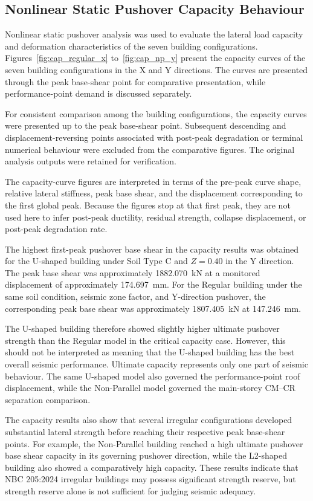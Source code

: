 \subsection{Nonlinear Static Pushover Capacity Behaviour}
Nonlinear static pushover analysis was used to evaluate the lateral load capacity and deformation characteristics of the seven building configurations. Figures~\ref{fig:cap_regular_x} to~\ref{fig:cap_np_y} present the capacity curves of the seven building configurations in the X and Y directions. The curves are presented through the peak base-shear point for comparative presentation, while performance-point demand is discussed separately.

For consistent comparison among the building configurations, the capacity curves were presented up to the peak base-shear point. Subsequent descending and displacement-\allowbreak{}reversing points associated with post-peak degradation or terminal numerical behaviour were excluded from the comparative figures. The original analysis outputs were retained for verification.

The capacity-curve figures are interpreted in terms of the pre-peak curve shape, relative lateral stiffness, peak base shear, and the displacement corresponding to the first global peak. Because the figures stop at that first peak, they are not used here to infer post-peak ductility, residual strength, collapse displacement, or post-peak degradation rate.

The highest first-peak pushover base shear in the capacity results was obtained for the U-shaped building under Soil Type C and $Z=0.40$ in the Y direction. The peak base shear was approximately 1882.070~kN at a monitored displacement of approximately 174.697~mm. For the Regular building under the same soil condition, seismic zone factor, and Y-direction pushover, the corresponding peak base shear was approximately 1807.405~kN at 147.246~mm.

The U-shaped building therefore showed slightly higher ultimate pushover strength than the Regular model in the critical capacity case. However, this should not be interpreted as meaning that the U-shaped building has the best overall seismic performance. Ultimate capacity represents only one part of seismic behaviour. The same U-shaped model also governed the performance-point roof displacement, while the Non-Parallel model governed the main-storey CM--CR separation comparison.

The capacity results also show that several irregular configurations developed substantial lateral strength before reaching their respective peak base-shear points. For example, the Non-Parallel building reached a high ultimate pushover base shear capacity in its governing pushover direction, while the L2-shaped building also showed a comparatively high capacity. These results indicate that NBC 205:2024 irregular buildings may possess significant strength reserve, but strength reserve alone is not sufficient for judging seismic adequacy.

